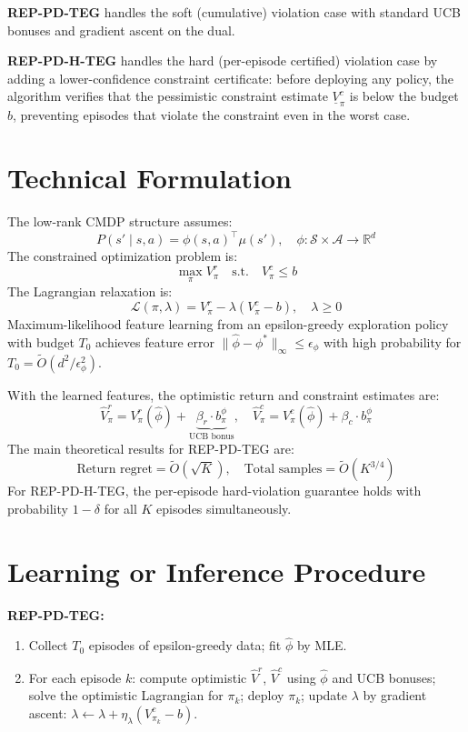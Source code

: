 \documentclass[10pt,twocolumn]{article}
\begin{document}
\textbf{REP-PD-TEG} handles the soft (cumulative) violation case with
standard UCB bonuses and gradient ascent on the dual.

\textbf{REP-PD-H-TEG} handles the hard (per-episode certified) violation case
by adding a lower-confidence constraint certificate: before deploying any policy,
the algorithm verifies that the pessimistic constraint estimate $\underline{V}^c_\pi$
is below the budget $b$, preventing episodes that violate the constraint even in
the worst case.

\section{Technical Formulation}

The low-rank CMDP structure assumes:
\[
P(s' \mid s, a) = \phi(s,a)^\top \mu(s'), \quad \phi: \mathcal{S}\times\mathcal{A} \to \mathbb{R}^d
\]
The constrained optimization problem is:
\[
\max_\pi V^r_\pi \quad \text{s.t.} \quad V^c_\pi \leq b
\]
The Lagrangian relaxation is:
\[
\mathcal{L}(\pi, \lambda) = V^r_\pi - \lambda(V^c_\pi - b), \quad \lambda \geq 0
\]
Maximum-likelihood feature learning from an epsilon-greedy exploration policy
with budget $T_0$ achieves feature error $\|\hat{\phi} - \phi^*\|_\infty \leq \epsilon_\phi$
with high probability for $T_0 = \tilde{O}(d^2/\epsilon_\phi^2)$.

With the learned features, the optimistic return and constraint estimates are:
\[
\hat{V}^r_\pi = V^r_\pi(\hat{\phi}) + \underbrace{\beta_r \cdot b^\phi_\pi}_{\text{UCB bonus}},
\quad
\hat{V}^c_\pi = V^c_\pi(\hat{\phi}) + \beta_c \cdot b^\phi_\pi
\]
The main theoretical results for REP-PD-TEG are:
\[
\text{Return regret} = \tilde{O}(\sqrt{K}), \quad
\text{Total samples} = \tilde{O}(K^{3/4})
\]
For REP-PD-H-TEG, the per-episode hard-violation guarantee holds with
probability $1-\delta$ for all $K$ episodes simultaneously.

\section{Learning or Inference Procedure}

\textbf{REP-PD-TEG:}
\begin{enumerate}[itemsep=2pt,parsep=0pt]
  \item Collect $T_0$ episodes of epsilon-greedy data; fit $\hat{\phi}$ by MLE.
  \item For each episode $k$: compute optimistic $\hat{V}^r$, $\hat{V}^c$
    using $\hat{\phi}$ and UCB bonuses; solve the optimistic Lagrangian for
    $\pi_k$; deploy $\pi_k$; update $\lambda$ by gradient ascent:
    $\lambda \leftarrow \lambda + \eta_\lambda (V^c_{\pi_k} - b)$.
\end{enumerate}
\end{document}
